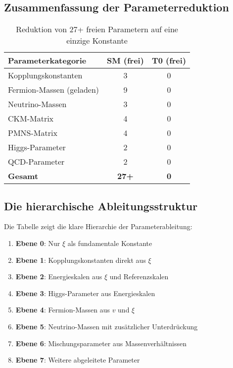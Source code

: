 \documentclass[12pt,a4paper]{article}
\theoremstyle{definition}
\begin{document}
\subsection{Zusammenfassung der Parameterreduktion}
\label{subsec:reduction_summary}

\begin{table}[h]
	\centering
	\begin{tabular}{lcc}
		\toprule
		\textbf{Parameterkategorie} & \textbf{SM (frei)} & \textbf{T0 (frei)} \\
		\midrule
		Kopplungskonstanten & 3 & 0 \\
		Fermion-Massen (geladen) & 9 & 0 \\
		Neutrino-Massen & 3 & 0 \\
		CKM-Matrix & 4 & 0 \\
		PMNS-Matrix & 4 & 0 \\
		Higgs-Parameter & 2 & 0 \\
		QCD-Parameter & 2 & 0 \\
		\midrule
		\textbf{Gesamt} & \textbf{27+} & \textbf{0} \\
		\bottomrule
	\end{tabular}
	\caption{Reduktion von 27+ freien Parametern auf eine einzige Konstante}
\end{table}

\subsection{Die hierarchische Ableitungsstruktur}
\label{subsec:hierarchical_structure}

Die Tabelle zeigt die klare Hierarchie der Parameterableitung:

\begin{enumerate}
	\item \textbf{Ebene 0}: Nur $\xi$ als fundamentale Konstante
	\item \textbf{Ebene 1}: Kopplungskonstanten direkt aus $\xi$
	\item \textbf{Ebene 2}: Energieskalen aus $\xi$ und Referenzskalen
	\item \textbf{Ebene 3}: Higgs-Parameter aus Energieskalen
	\item \textbf{Ebene 4}: Fermion-Massen aus $v$ und $\xi$
	\item \textbf{Ebene 5}: Neutrino-Massen mit zusätzlicher Unterdrückung
	\item \textbf{Ebene 6}: Mischungsparameter aus Massenverhältnissen
	\item \textbf{Ebene 7}: Weitere abgeleitete Parameter
\end{enumerate}
\end{document}
